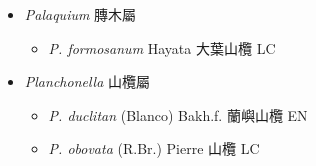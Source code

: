 
  \begin{itemize}
 \item[] \textit{Palaquium} 膞木屬
                                
  \begin{itemize}
        \item[] \textit{P. formosanum} Hayata  大葉山欖   LC
  \end{itemize}
 \item[] \textit{Planchonella} 山欖屬
                                
  \begin{itemize}
        \item[] \textit{P. duclitan} (Blanco) Bakh.f.  蘭嶼山欖   EN
        \item[] \textit{P. obovata} (R.Br.) Pierre  山欖   LC
  \end{itemize}
  \end{itemize}

